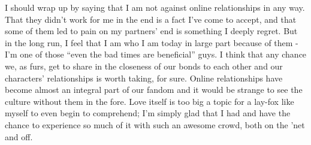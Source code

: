 I should wrap up by saying that I am not against online relationships in
any way. That they didn't work for me in the end is a fact I've come to
accept, and that some of them led to pain on my partners' end is
something I deeply regret. But in the long run, I feel that I am who I
am today in large part because of them - I'm one of those ``even the bad
times are beneficial'' guys. I think that any chance we, as furs, get to
share in the closeness of our bonds to each other and our characters'
relationships is worth taking, for sure. Online relationships have
become almost an integral part of our fandom and it would be strange to
see the culture without them in the fore. Love itself is too big a topic
for a lay-fox like myself to even begin to comprehend; I'm simply glad
that I had and have the chance to experience so much of it with such an
awesome crowd, both on the 'net and off.
